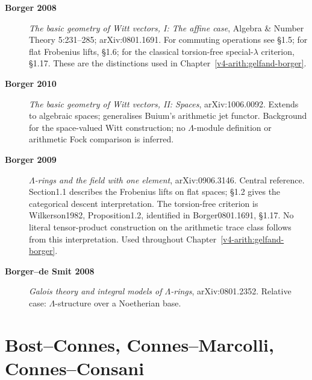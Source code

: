 \begin{description}
\item[\textbf{Borger 2008}] \emph{The basic geometry of Witt
vectors, I: The affine case}, Algebra \& Number Theory 5:231--285;
arXiv:0801.1691. For commuting operations see \S1.5; for flat Frobenius lifts,
\S1.6; for the classical torsion-free special-\(\lambda\) criterion,
\S1.17. These are the distinctions used in
Chapter~\ref{v4-arith:gelfand-borger}.
\item[\textbf{Borger 2010}] \emph{The basic geometry of Witt
vectors, II: Spaces}, arXiv:1006.0092. Extends to algebraic spaces;
generalises Buium's arithmetic jet functor. Background for the space-valued Witt construction; no
\(\Lambda\)-module definition or arithmetic Fock comparison is inferred.
\item[\textbf{Borger 2009}] \emph{\(\Lambda\)-rings and the field
with one element}, arXiv:0906.3146. Central reference. Section1.1 describes the Frobenius lifts on flat spaces;
\S1.2 gives the categorical descent interpretation. The
torsion-free criterion is Wilkerson1982, Proposition1.2, identified
in Borger0801.1691, \S1.17. No literal tensor-product construction on
the arithmetic trace class follows from this interpretation. Used throughout
Chapter~\ref{v4-arith:gelfand-borger}.
\item[\textbf{Borger--de Smit 2008}] \emph{Galois theory and
integral models of \(\Lambda\)-rings}, arXiv:0801.2352. Relative
case: \(\Lambda\)-structure over a Noetherian base.
\end{description}

\section{Bost--Connes, Connes--Marcolli, Connes--Consani}
\label{v4-arith:app:A:connes-etc}

